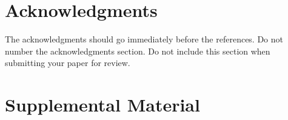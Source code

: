 \documentclass[11pt]{article}
\begin{document}





\section*{Acknowledgments}

The acknowledgments should go immediately before the references.  Do
not number the acknowledgments section. Do not include this section
when submitting your paper for review.

%
%


\appendix

\section{Supplemental Material}
\label{sec:supplemental}
%
%
%
\end{document}
